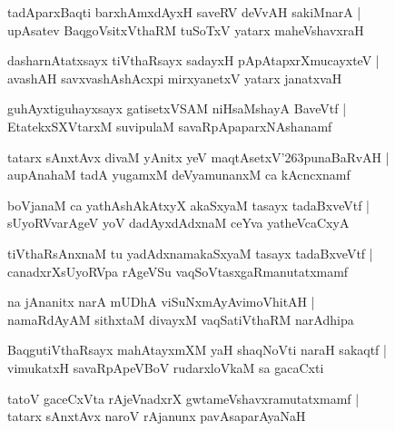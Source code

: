 \documentclass[twoside,12pt,openright]{book}
\def\S{\char'263}
\newcounter{shloka}[chapter]
\begin{document}
\begin{shloka}
tadAparxBaqti barxhAmxdAyxH saveRV deVvAH sakiMnarA |\\
upAsatev BaqgoVsitxVthaRM tuSoTxV yatarx maheVshavxraH 
\end{shloka}

\begin{shloka}
dasharnAtatxsayx tiVthaRsayx sadayxH pApAtapxrXmucayxteV |\\
avashAH savxvashAshAcxpi mirxyanetxV yatarx janatxvaH 
\end{shloka}

\begin{shloka}
guhAyxtiguhayxsayx gatisetxVSAM niHsaMshayA BaveVtf |\\
EtatekxSXVtarxM  suvipulaM savaRpApaparxNAshanamf
\end{shloka}

\begin{shloka}
tatarx sAnxtAvx divaM yAnitx yeV maqtAsetxV\S punaBaRvAH |\\
aupAnahaM tadA yugamxM deVyamunanxM ca kAcncxnamf 
\end{shloka}

\begin{shloka}
boVjanaM ca yathAshAkAtxyX akaSxyaM tasayx tadaBxveVtf |\\
sUyoRVvarAgeV yoV dadAyxdAdxnaM ceYva yatheVcaCxyA 
\end{shloka}

\begin{shloka}
tiVthaRsAnxnaM tu yadAdxnamakaSxyaM tasayx tadaBxveVtf |\\
canadxrXsUyoRVpa rAgeVSu vaqSoVtasxgaRmanutatxmamf
\end{shloka}

\begin{shloka}
na jAnanitx narA mUDhA viSuNxmAyAvimoVhitAH |\\
namaRdAyAM sithxtaM divayxM vaqSatiVthaRM narAdhipa
\end{shloka}

\begin{shloka}
BaqgutiVthaRsayx mahAtayxmXM yaH shaqNoVti naraH sakaqtf |\\
vimukatxH savaRpApeVBoV rudarxloVkaM sa gacaCxti
\end{shloka}

\begin{shloka}
tatoV gaceCxVta rAjeVnadxrX gwtameVshavxramutatxmamf |\\
tatarx sAnxtAvx naroV rAjanunx pavAsaparAyaNaH
\end{shloka}
\end{document}
